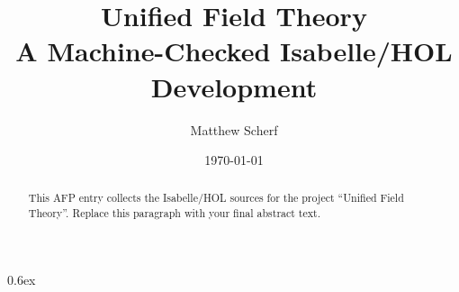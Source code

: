 \documentclass[11pt,a4paper]{article}
\title{Unified Field Theory\\[0.25em]\large A Machine-Checked Isabelle/HOL Development}
\author{Matthew Scherf}
\date{\today}
\begin{document}
\maketitle

\begin{abstract}
This AFP entry collects the Isabelle/HOL sources for the project ``Unified Field Theory''.
Replace this paragraph with your final abstract text.
\end{abstract}

\tableofcontents
\bigskip

\parindent 0pt \parskip 0.6ex




\end{document}
